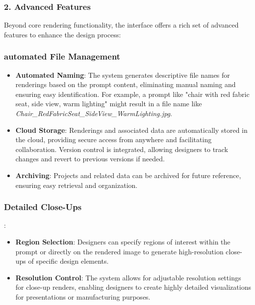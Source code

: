 \documentclass{article}
\begin{document}
\begin{itemize}
\subsubsection{2. Advanced Features}

Beyond core rendering functionality, the interface offers a rich set of advanced features to enhance the design process:

\subsubsection{automated File Management}
\begin{itemize}
    \item \textbf{Automated Naming}: The system generates descriptive file names for renderings based on the prompt content, eliminating manual naming and ensuring easy identification. For example, a prompt like "chair with red fabric seat, side view, warm lighting" might result in a file name like \textit{Chair\_RedFabricSeat\_SideView\_WarmLighting.jpg}.
    \item \textbf{Cloud Storage}: Renderings and associated data are automatically stored in the cloud, providing secure access from anywhere and facilitating collaboration. Version control is integrated, allowing designers to track changes and revert to previous versions if needed.
    \item \textbf{Archiving}: Projects and related data can be archived for future reference, ensuring easy retrieval and organization.
\end{itemize}

\subsubsection{Detailed Close-Ups}:
\begin{itemize}
    \item \textbf{Region Selection}: Designers can specify regions of interest within the prompt or directly on the rendered image to generate high-resolution close-ups of specific design elements.
    \item \textbf{Resolution Control}: The system allows for adjustable resolution settings for close-up renders, enabling designers to create highly detailed visualizations for presentations or manufacturing purposes.
\end{itemize}


\end{itemize}
\end{document}
